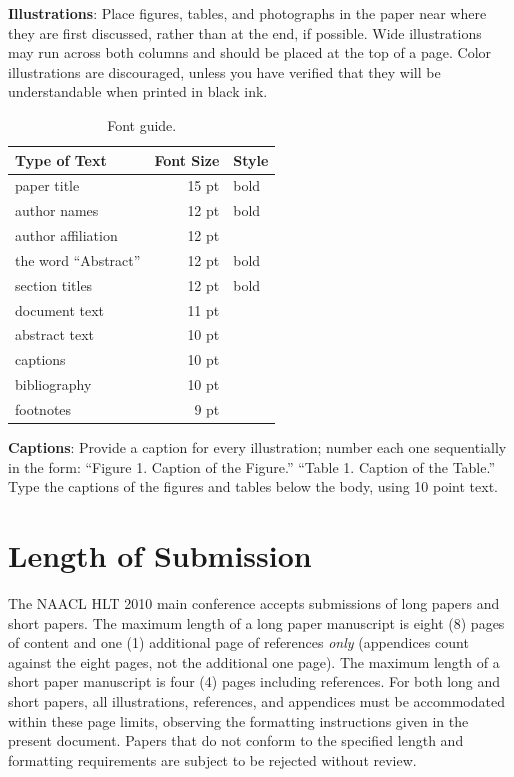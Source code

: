 \documentclass[11pt,letterpaper]{article}
\begin{document}
{\bf Illustrations}: Place figures, tables, and photographs in the
paper near where they are first discussed, rather than at the end, if
possible.  Wide illustrations may run across both columns and should be placed at
the top of a page. Color illustrations are discouraged, unless you have verified that 
they will be understandable when printed in black ink.

\begin{table}
\begin{center}
\begin{tabular}{|l|rl|}
\hline \bf Type of Text & \bf Font Size & \bf Style \\ \hline
paper title & 15 pt & bold \\
author names & 12 pt & bold \\
author affiliation & 12 pt & \\
the word ``Abstract'' & 12 pt & bold \\
section titles & 12 pt & bold \\
document text & 11 pt  &\\
abstract text & 10 pt & \\
captions & 10 pt & \\
bibliography & 10 pt & \\
footnotes & 9 pt & \\
\hline
\end{tabular}
\end{center}
\caption{\label{font-table} Font guide. }
\end{table}

{\bf Captions}: Provide a caption for every illustration; number each one
sequentially in the form:  ``Figure 1. Caption of the Figure.'' ``Table 1.
Caption of the Table.''  Type the captions of the figures and 
tables below the body, using 10 point text.  

\section{Length of Submission}
\label{sec:length}

The NAACL HLT 2010 main conference accepts submissions of long papers
and short papers.  The maximum length of a long paper manuscript is
eight (8) pages of content and one (1) additional page of references
\emph{only} (appendices count against the eight pages, not the
additional one page).  The maximum length of a short paper manuscript
is four (4) pages including references.  For both long and short
papers, all illustrations, references, and appendices must be
accommodated within these page limits, observing the formatting
instructions given in the present document.  Papers that do not
conform to the specified length and formatting requirements are
subject to be rejected without review.
\end{document}
